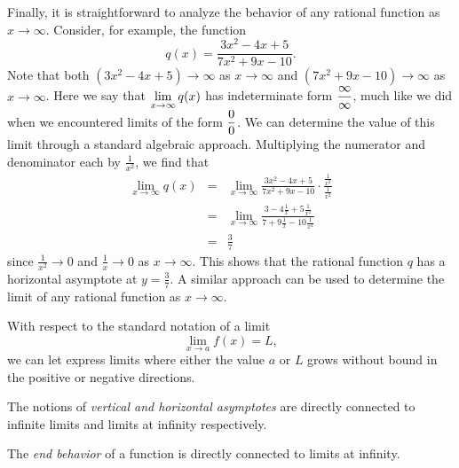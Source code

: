 Finally, it is straightforward to analyze the behavior of any rational function as $x \to \infty$.  Consider, for example, the function 
\[ q(x) =  \frac{3x^2 - 4x + 5}{7x^2 + 9x - 10}. \]
Note that both $(3x^2 - 4x + 5) \to \infty$ as $x \to \infty$ and $(7x^2 + 9x - 10) \to \infty$ as $x \to \infty$.  Here we say that $\displaystyle \lim_{x \to \infty} q(x)$ has indeterminate form $\displaystyle \frac{\infty}{\infty}$, much like we did when we encountered limits of the form $\displaystyle \frac{0}{0}$.  We can determine the value of this limit through a standard algebraic approach.  Multiplying the numerator and denominator each by $\frac{1}{x^2}$, we find that
\begin{eqnarray*}
\lim_{x \to \infty} q(x) & = & \lim_{x \to \infty} \frac{3x^2 - 4x + 5}{7x^2 + 9x - 10} \cdot \frac{\frac{1}{x^2}}{\frac{1}{x^2}} \\
& = & \lim_{x \to \infty} \frac{3 - 4\frac{1}{x} + 5\frac{1}{x^2}}{7 + 9\frac{1}{x} - 10\frac{1}{x^2}} \\
& = & \frac{3}{7}
\end{eqnarray*}
since $\frac{1}{x^2} \to 0$ and $\frac{1}{x} \to 0$ as $x \to \infty$.  This shows that the rational function $q$ has a horizontal asymptote at $y = \frac{3}{7}$.  A similar approach can be used to determine the limit of any rational function as $x \to \infty$.


\begin{summary}
\item With respect to the standard notation of a limit
\[ \lim_{x \to a} f(x) = L, \]
we can let express limits where either the value $a$ or $L$ grows without bound in the positive or negative directions.

\item The notions of {\em vertical and horizontal asymptotes} are directly connected to infinite limits and limits at infinity respectively.

\item The {\em end behavior} of a function is directly connected to limits at infinity.
\end{summary}

\clearpage

 

\cleardoublepage